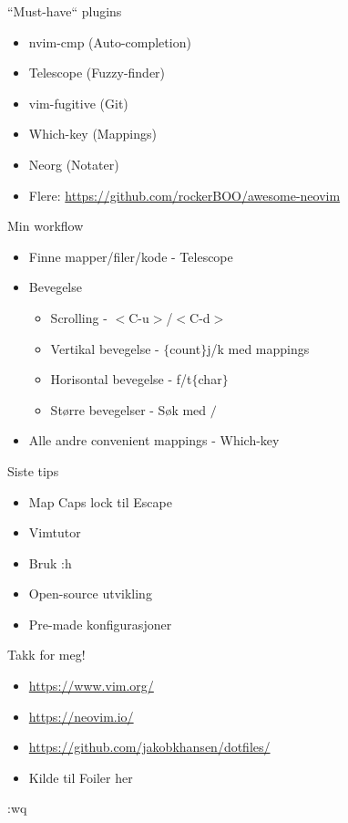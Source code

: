 \documentclass{beamer}
\begin{document}
\begin{frame}{``Must-have`` plugins}
	\begin{itemize}
		\item nvim-cmp (Auto-completion)
		\item Telescope (Fuzzy-finder)
		\item vim-fugitive (Git)
        \item Which-key (Mappings)
		\item Neorg (Notater)
        \item Flere: \url{https://github.com/rockerBOO/awesome-neovim}
	\end{itemize}
\end{frame}

\begin{frame}{Min workflow}
    \begin{itemize}
        \item Finne mapper/filer/kode - Telescope
        \item Bevegelse
            \begin{itemize}
                \item Scrolling - $<$C-u$>$/$<$C-d$>$ 
                \item Vertikal bevegelse - $\{$count$\}$j/k med mappings
                \item Horisontal bevegelse - f/t$\{$char$\}$
                \item Større bevegelser - Søk med $/$
            \end{itemize}
        \item Alle andre convenient mappings - Which-key
    \end{itemize}
\end{frame}

\begin{frame}{Siste tips}
    \begin{itemize}
        \item Map Caps lock til Escape
        \item Vimtutor
        \item Bruk :h
        \item Open-source utvikling
        \item Pre-made konfigurasjoner
    \end{itemize}
\end{frame}
\begin{frame}{Takk for meg!}
    \begin{itemize}
        \item \url{https://www.vim.org/}
        \item \url{https://neovim.io/}
        \item \url{https://github.com/jakobkhansen/dotfiles/}

        \item Kilde til Foiler her
    \end{itemize}
    :wq
\end{frame}
\end{document}
